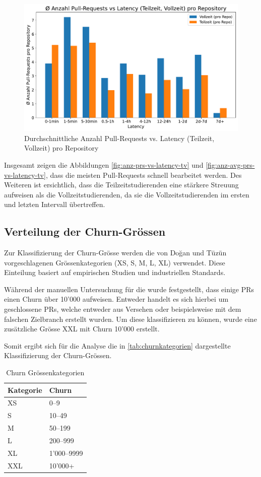 \begin{figure}[htbp]
    \includegraphics[width=\textwidth]{Figures/anz-avg-prs-vs-latency-tv.pdf}
    \caption{Durchschnittliche Anzahl Pull-Requests vs. Latency (Teilzeit, Vollzeit) pro Repository}
    \label{fig:anz-avg-prs-vs-latency-tv}
\end{figure}


Insgesamt zeigen die Abbildungen \autoref{fig:anz-prs-vs-latency-tv} und \autoref{fig:anz-avg-prs-vs-latency-tv}, dass die meisten Pull-Requests schnell bearbeitet werden. Des Weiteren ist ersichtlich, dass die Teilzeitstudierenden eine stärkere Streuung aufweisen als die Vollzeitstudierenden, da sie die Vollzeitstudierenden im ersten und letzten Intervall übertreffen.

\subsection{Verteilung der Churn-Grössen}
Zur Klassifizierung der Churn-Grösse werden die von Doğan und Tüzün \parencite{dogan_towards_2022} vorgeschlagenen Grössenkategorien (XS, S, M, L, XL) verwendet. Diese Einteilung basiert auf empirischen Studien und industriellen Standards.

Während der manuellen Untersuchung für die  wurde festgestellt, dass einige PRs einen Churn über 10'000 aufweisen. Entweder handelt es sich hierbei um geschlossene PRs, welche entweder aus Versehen oder beispielsweise mit dem falschen Zielbranch erstellt wurden. Um diese klassifizieren zu können, wurde eine zusätzliche Grösse XXL mit Churn 10'000 erstellt. 

Somit ergibt sich für die Analyse die in \autoref{tab:churnkategorien} dargestellte Klassifizierung der Churn-Grössen.
\begin{table}[ht]
\caption{Churn Grössenkategorien}
\label{tab:churnkategorien}
\centering
\begin{tabular}{l l}
\toprule
\textbf{Kategorie} & \textbf{Churn} \\
\midrule
XS  & 0--9       \\
S        & 10--49     \\
M        & 50--199    \\
L         & 200--999   \\
XL   & 1'000--9999 \\
XXL  & 10'000+ \\
\bottomrule
\end{tabular}
\end{table}


